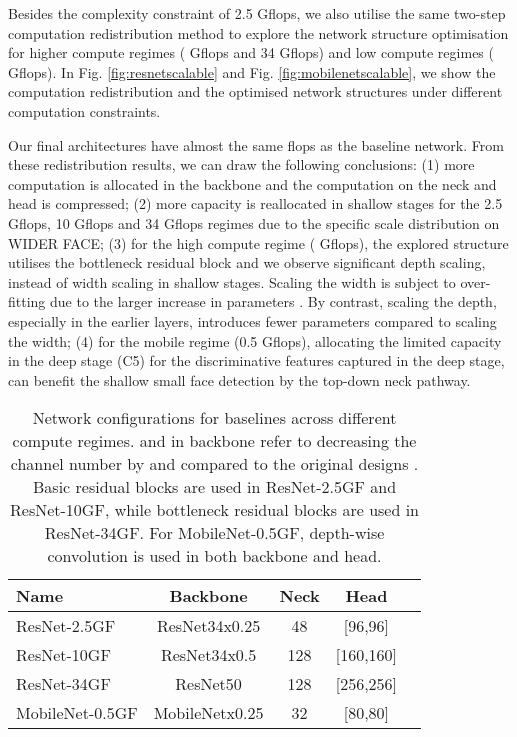 \documentclass[10pt,twocolumn,letterpaper]{article}
\begin{document}
Besides the complexity constraint of 2.5 Gflops, we also utilise the same two-step computation redistribution method to explore the network structure optimisation for higher compute regimes ( Gflops and 34 Gflops) and low compute regimes ( Gflops). In Fig. \ref{fig:resnetscalable} and Fig. \ref{fig:mobilenetscalable}, we show the computation redistribution and the optimised network structures under different computation constraints.

Our final architectures have almost the same flops as the baseline network. From these redistribution results, we can draw the following conclusions: (1) more computation is allocated in the backbone and the computation on the neck and head is compressed; (2) more capacity is reallocated in shallow stages for the 2.5 Gflops, 10 Gflops and 34 Gflops regimes due to the specific scale distribution on WIDER FACE; (3) for the high compute regime ( Gflops), the explored structure utilises the bottleneck residual block and we observe significant depth scaling, instead of width scaling in shallow stages. Scaling the width is subject to over-fitting due to the larger increase in parameters \cite{Revisiting2021ResNets}. By contrast, scaling the depth, especially in the earlier layers, introduces fewer parameters compared to scaling the width; (4) for the mobile regime (0.5 Gflops), allocating the limited capacity in the deep stage (\eg C5) for the discriminative features captured in the deep stage, can benefit the shallow small face detection by the top-down neck pathway.

\begin{table}[t!]
\small
\centering
\begin{tabular}{l|cccc}
\hline
Name  & Backbone & Neck & Head  \\
\hline\hline
ResNet-2.5GF        & ResNet34x0.25  & 48   & [96,96]\\
ResNet-10GF         & ResNet34x0.5  & 128  & [160,160]\\
ResNet-34GF         & ResNet50  & 128  & [256,256]\\
\hline
MobileNet-0.5GF     & MobileNetx0.25 & 32   & [80,80]\\
\hline
\end{tabular}
\hspace{1in}
\caption{Network configurations for baselines across different compute regimes. 
 and  in backbone refer to decreasing the channel number by  and  compared to the original designs \cite{he2016deep,howard2017mobilenets}. Basic residual blocks are used in ResNet-2.5GF and ResNet-10GF, while bottleneck residual blocks are used in ResNet-34GF. For MobileNet-0.5GF, depth-wise convolution is used in both backbone and head.}
\label{tab:baselines}
\vspace{-4mm}
\end{table}
\end{document}
